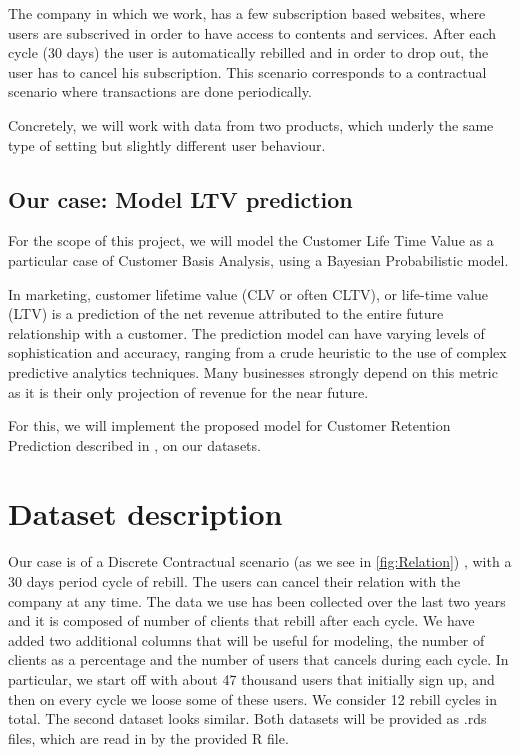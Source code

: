 \documentclass[paper=a4, fontsize=11pt]{scrartcl} %
\numberwithin{equation}{section} %
\numberwithin{figure}{section} %
\numberwithin{table}{section} %
\begin{document}
	The company in which we work, has a few subscription based websites, where users are subscrived in order to have access to contents and services. After each cycle (30 days) the user is automatically rebilled and in order to drop out, the user has to cancel his subscription. This scenario corresponds to a contractual scenario where transactions are done periodically.
	
	Concretely, we will work with data from two products, which underly the same type of setting but slightly different user behaviour.
	
	\subsection{Our case: Model LTV prediction}
	For the scope of this project, we will model the Customer Life Time Value as a particular case of Customer Basis Analysis, using a Bayesian Probabilistic model.
	
	In marketing, customer lifetime value (CLV or often CLTV), or life-time value (LTV) is a prediction of the net revenue attributed to the entire future relationship with a customer. The prediction model can have varying levels of sophistication and accuracy, ranging from a crude heuristic to the use of complex predictive analytics techniques. Many businesses strongly depend on this metric as it is their only projection of revenue for the near future.
	
	For this, we will implement the proposed model for Customer Retention Prediction described in \cite{feder07}, on our datasets.
	
	\section{Dataset description}
	
	Our case is of a Discrete Contractual scenario (as we see in \ref{fig:Relation}) , with a 30 days period cycle of rebill. The users can cancel their relation with the company at any time.
	The data we use has been collected over the last two years and it is composed of number of clients that rebill after each cycle. We have added two additional columns that will be useful for modeling, the number of clients as a percentage and the number of users that cancels during each cycle. In particular, we start off with about 47 thousand users that initially sign up, and then on every cycle we loose some of these users. We consider 12 rebill cycles in total. The second dataset looks similar. Both datasets will be provided as .rds files, which are read in by the provided R file.
	
\end{document}
